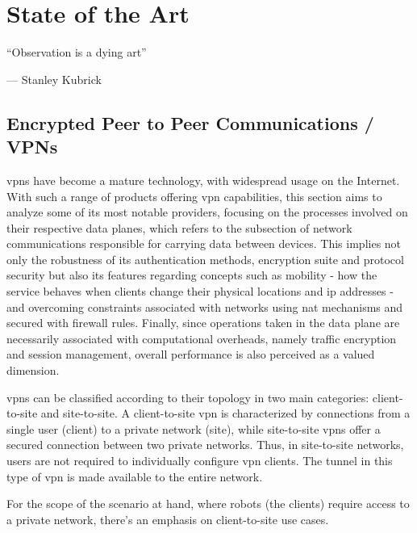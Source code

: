 \documentclass[11pt,twoside,a4paper]{report}
\begin{document}
\cleardoublepage


\chapter{State of the Art}
\label{chapter:sota}

\begin{minipage}{50mm}
     \centering %
     ``Observation is a dying art''
          \begin{flushright}
          --- Stanley Kubrick
          \end{flushright}
     \end{minipage}

\section{Encrypted Peer to Peer Communications / VPNs}

\ac{vpn}s have become a mature technology, with widespread usage on the Internet. With such a range of products offering \ac{vpn} capabilities, this section aims to analyze some of its most notable providers, focusing on the processes involved on their respective data planes, which refers to the subsection of network communications responsible for carrying data between devices. This implies not only the robustness of its authentication methods, encryption suite and protocol security but also its features regarding concepts such as mobility - how the service behaves when clients change their physical locations and \ac{ip} addresses - and overcoming constraints associated with networks using \ac{nat} mechanisms and secured with firewall rules. Finally, since operations taken in the data plane are necessarily associated with computational overheads, namely traffic encryption and session management, overall performance is also perceived as a valued dimension.

\ac{vpn}s can be classified according to their topology in two main categories: client-to-site and site-to-site. A client-to-site \ac{vpn} is characterized by connections from a single user (client) to a private network (site), while site-to-site \ac{vpn}s offer a secured connection between two private networks. Thus, in site-to-site networks, users are not required to individually configure \ac{vpn} clients. The tunnel in this type of \ac{vpn} is made available to the entire network.

For the scope of the scenario at hand, where robots (the clients) require access to a private network, there's an emphasis on client-to-site use cases.
\end{document}
